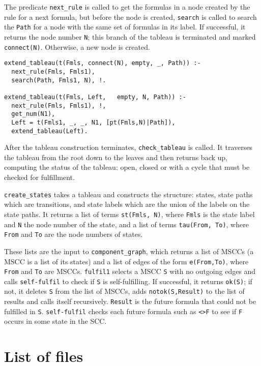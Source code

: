 \documentclass[11pt]{article}
\newcommand*{\p}[1]{\textup{\texttt{#1}}}
\begin{document}
The predicate \p{next\_rule} is called to get the formulas in a node
created by the rule for a next formula, but before the node is
created, \p{search} is called to search the \p{Path} for a node with the
same set of formulas in its label. If successful, it returns the node
number \p{N}; this branch of the tableau is terminated and marked
\p{connect(N)}. Otherwise, a new node is created.

\begin{verbatim}
extend_tableau(t(Fmls, connect(N), empty, _, Path)) :-
  next_rule(Fmls, Fmls1),
  search(Path, Fmls1, N), !.

extend_tableau(t(Fmls, Left,   empty, N, Path)) :-
  next_rule(Fmls, Fmls1), !,
  get_num(N1),
  Left = t(Fmls1, _, _, N1, [pt(Fmls,N)|Path]),
  extend_tableau(Left).
\end{verbatim}

After the tableau construction terminates, \p{check\_tableau} is called.
It traverses the tableau from the root down to the leaves and then
returns back up, computing the status of the tableau: open, closed or
with a cycle that must be checked for fulfillment.

\p{create\_states} takes a tableau and constructs the structure: states,
state paths which are transitions, and state labels which are the union
of the labels on the state paths. It returns a list of terms
\p{st(Fmls,~N)}, where \p{Fmls} is the state label and \p{N} the node
number of the state, and a list of terms \p{tau(From,~To)}, where
\p{From} and \p{To} are the node numbers of states.

These lists are the input to \p{component\_graph}, which returns a list
of MSCCs (a MSCC is a list of its states) and a list of edges of the
form \p{e(From,To)}, where \p{From} and \p{To} are MSCCs. \p{fulfil1}
selects a MSCC \p{S} with no outgoing edges and calls \p{self-fulfil} to
check if \p{S} is self-fulfilling. If successful, it returns \p{ok(S)};
if not, it deletes \p{S} from the list of MSCCs, adds
\p{notok(S,Result)} to the list of results and calls itself recursively.
\p{Result} is the future formula that could not be fulfilled in \p{S}.
\p{self-fulfil} checks each future formula such as \p{<>F} to see if
\p{F} occurs in some state in the SCC.


\newpage


\appendix
\section{List of files}\label{s.list}
\end{document}
